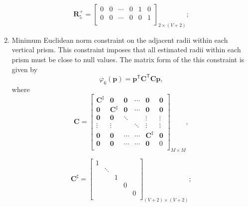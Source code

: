 \begin{enumerate}
\begin{equation}
\textbf{R}^{+}_{5} = 
\begin{bmatrix}
0 & 0 & \cdots & 0 & 1 & 0 \\
0 & 0 & \cdots & 0 & 0 & 1 \\
\end{bmatrix}_{2\times (V+2)};
\end{equation}

\item Minimum Euclidean norm constraint on the adjacent radii within each vertical prism. This constraint imposes that all estimated radii within each prism must be close to null values. The matrix form of the this constraint is given by
\begin{equation}
\varphi_{6}(\textbf{p}) = \textbf{p}^\mathsf{T}\textbf{C}^\mathsf{T}\textbf{C}\textbf{p},
\end{equation}
where
\begin{equation}
\textbf{C} = 
\begin{bmatrix}
\textbf{C}^{\sharp} & \mathbf{0} & \mathbf{0} & \cdots & \mathbf{0} & \mathbf{0}\\
\mathbf{0} & \textbf{C}^{\sharp} &  \mathbf{0} & \cdots & \mathbf{0} & \mathbf{0}\\
\mathbf{0} & \mathbf{0} & \ddots & & \vdots & \vdots\\
\vdots & \vdots & & \ddots & \vdots & \vdots\\
\mathbf{0} & \mathbf{0} &  \cdots & \cdots & \textbf{C}^{\sharp} & \mathbf{0}\\
\mathbf{0} & \mathbf{0} &  \cdots &  \cdots & \mathbf{0} & 0\\
\end{bmatrix}_{M\times M} ,
\end{equation}

\begin{equation}
\textbf{C}^{\sharp} = 
\begin{bmatrix}
1 & & & & \\
& \ddots &  & &  \\
&  & 1 & & \\
&  & & 0 &  \\
&  & & & 0 \\
\end{bmatrix}_{(V+2)\times (V+2)};
\end{equation}


\end{enumerate}
